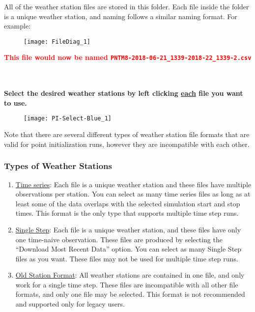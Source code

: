 \documentclass[12pt]{article}
\begin{document}
All of the weather station files are stored in this folder. Each file inside the folder is a unique weather station, and naming follows a similar naming format. For example:

\begin{figure}[H]
	\centering
	\label{}
	\texttt{[image: FileDiag\_1]}
\end{figure}

\begin{note}
\textcolor{red}{\textbf{ This file would now be named
\texttt{PNTM8-2018-06-21\_1339-2018-22\_1339-2.csv}}}
\end{note}

\textbf{\color{red}\\ \\Select the desired weather stations by left clicking \underline{each} file you want to use.}

\begin{figure}[H]
	\centering
	\label{}
	\texttt{[image: PI-Select-Blue\_1]}
\end{figure}

Note that there are several different types of weather station file formats that are valid  for point initialization runs, however they are incompatible with each other.

\subsubsection{Types of Weather Stations}
\begin{enumerate}
	\item  \underline{Time series}: Each file is a unique weather station and these files have multiple observations per station. You can select as many time series files as long as at least some of the data overlaps with the selected simulation start and stop times. This format is the only type that supports multiple time step runs.
	\item \underline{Single Step}: Each file is a unique weather station, and these files have only one time-naive observation. These files are produced by selecting the “Download Most Recent Data” option. You can select as many Single Step  files as you want. These files may not be used for multiple time step runs.
	\item \underline{Old Station Format}: All weather stations are contained in one file, and only work for a single time step. These files are incompatible with all other file formats, and only one file may be selected. This format is not recommended and supported only for legacy users.  
\end{enumerate}
\end{document}
